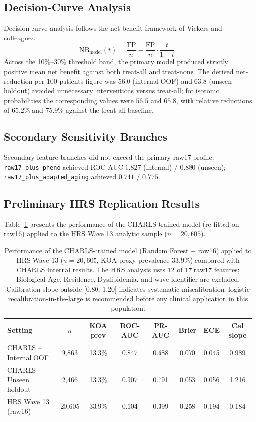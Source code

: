 \documentclass[11pt,a4paper]{article}
\begin{document}
\subsection{Decision-Curve Analysis}
Decision-curve analysis follows the net-benefit framework of Vickers and
colleagues\cite{Vickers2006,Vickers2016}:
\[
\mathrm{NB}_{\text{model}}(t) = \frac{\mathrm{TP}}{n} -
\frac{\mathrm{FP}}{n} \cdot \frac{t}{1-t}.
\]
Across the 10\%--30\% threshold band, the primary model produced strictly positive mean net benefit
against both treat-all and treat-none. The derived net-reduction-per-100-patients
figure\cite{Vickers2016} was $56.0$ (internal OOF) and $63.8$ (unseen holdout) avoided unnecessary
interventions versus treat-all; for isotonic probabilities the corresponding values were $56.5$ and
$65.8$, with relative reductions of $65.2\%$ and $75.9\%$ against the treat-all baseline.

\subsection{Secondary Sensitivity Branches}
Secondary feature branches did not exceed the primary raw17 profile: \texttt{raw17\_plus\_pheno}
achieved ROC-AUC $0.827$ (internal) / $0.880$ (unseen); \texttt{raw17\_plus\_adapted\_aging}
achieved $0.741$ / $0.775$.

\subsection{Preliminary HRS Replication Results}

Table~\ref{tab:hrs-metrics} presents the performance of the CHARLS-trained model (re-fitted on raw16)
applied to the HRS Wave 13 analytic sample ($n=20{,}605$).

\begin{table}[h!]
\centering
\small
\caption{Performance of the CHARLS-trained model (Random Forest + raw16) applied to HRS Wave 13
($n=20{,}605$, KOA proxy prevalence 33.9\%) compared with CHARLS internal results. The HRS
analysis uses 12 of 17 raw17 features; Biological Age, Residence, Dyslipidemia, and wave
identifier are excluded. Calibration slope outside [0.80, 1.20] indicates systematic miscalibration;
logistic recalibration-in-the-large is recommended before any clinical application in this
population.}
\label{tab:hrs-metrics}
\begin{tabular}{lccccccc}
\toprule
Setting & $n$ & KOA prev & ROC-AUC & PR-AUC & Brier & ECE & Cal slope \\
\midrule
CHARLS -- Internal OOF  & 9{,}863  & 13.3\% & 0.847 & 0.688 & 0.070 & 0.045 & 0.989 \\
CHARLS -- Unseen holdout & 2{,}466  & 13.3\% & 0.907 & 0.791 & 0.053 & 0.056 & 1.216 \\
\midrule
HRS Wave 13 (raw16) & 20{,}605 & 33.9\% & 0.604 & 0.399 & 0.258 & 0.194 & 0.184 \\
\bottomrule
\end{tabular}
\end{table}
\end{document}
